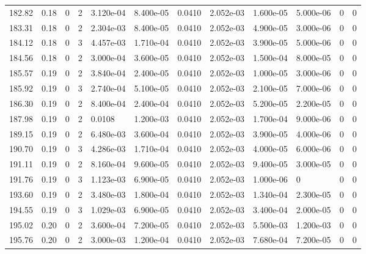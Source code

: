 \documentclass[preview]{standalone}
\begin{document}
{{{{{{{{\begin{tabular}{L{1.2cm}C{1.2cm} C{0.3cm}C{0.5cm} C{1.4cm}C{1.4cm} C{1.4cm}C{1.4cm} C{1.6cm}C{1.6cm} C{1.6cm}C{1.6cm}}
  182.82  &  0.18  & 0     &  2 &  3.120e-04  & 8.400e-05  &  0.0410&   2.052e-03& 1.600e-05 & 5.000e-06   &  0 & 0  \\ 
  183.31  &  0.18  & 0     &  2 &  2.304e-03  & 8.400e-05  &  0.0410&   2.052e-03& 4.900e-05 & 3.000e-06   &  0 & 0  \\ 
  184.12  &  0.18  & 0     &  3 &  4.457e-03  & 1.710e-04  &  0.0410&   2.052e-03& 3.900e-05 & 5.000e-06   &  0 & 0  \\ 
  184.56  &  0.18  & 0     &  2 &  3.000e-04  & 3.600e-05  &  0.0410&   2.052e-03& 1.500e-04 & 8.000e-05   &  0 & 0  \\ 
  185.57  &  0.19  & 0     &  2 &  3.840e-04  & 2.400e-05  &  0.0410&   2.052e-03& 1.000e-05 & 3.000e-06   &  0 & 0  \\ 
  185.92  &  0.19  & 0     &  3 &  2.740e-04  & 5.100e-05  &  0.0410&   2.052e-03& 2.100e-05 & 7.000e-06   &  0 & 0  \\ 
  186.30  &  0.19  & 0     &  2 &  8.400e-04  & 2.400e-04  &  0.0410&   2.052e-03& 5.200e-05 & 2.200e-05   &  0 & 0  \\ 
  187.98  &  0.19  & 0     &  2 &  0.0108  & 1.200e-03  &  0.0410&   2.052e-03& 1.700e-04 & 9.000e-06   &  0 & 0  \\ 
  189.15  &  0.19  & 0     &  2 &  6.480e-03  & 3.600e-04  &  0.0410&   2.052e-03& 3.900e-05 & 4.000e-06   &  0 & 0  \\ 
  190.70  &  0.19  & 0     &  3 &  4.286e-03  & 1.710e-04  &  0.0410&   2.052e-03& 4.000e-05 & 6.000e-06   &  0 & 0  \\ 
  191.11  &  0.19  & 0     &  2 &  8.160e-04  & 9.600e-05  &  0.0410&   2.052e-03& 9.400e-05 & 3.000e-05   &  0 & 0  \\ 
  191.76  &  0.19  & 0     &  3 &  1.123e-03  & 6.900e-05  &  0.0410&   2.052e-03& 1.000e-06 & 0   &  0 & 0  \\ 
  193.60  &  0.19  & 0     &  2 &  3.480e-03  & 1.800e-04  &  0.0410&   2.052e-03& 1.340e-04 & 2.300e-05   &  0 & 0  \\ 
  194.55  &  0.19  & 0     &  3 &  1.029e-03  & 6.900e-05  &  0.0410&   2.052e-03& 3.400e-04 & 2.000e-05   &  0 & 0  \\ 
  195.02  &  0.20  & 0     &  2 &  3.600e-04  & 7.200e-05  &  0.0410&   2.052e-03& 5.500e-03 & 1.200e-03   &  0 & 0  \\ 
  195.76  &  0.20  & 0     &  2 &  3.000e-03  & 1.200e-04  &  0.0410&   2.052e-03& 7.680e-04 & 7.200e-05   &  0 & 0  \\ 
\hline 
\end{tabular} 

}}}}}}}}
\end{document}
